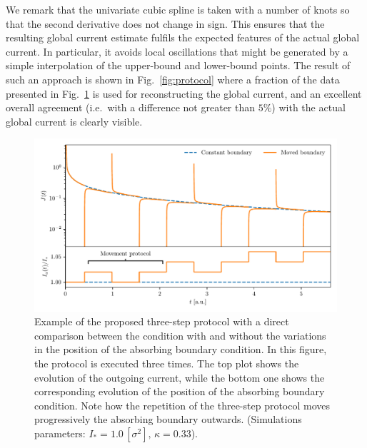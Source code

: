 We remark that the univariate cubic spline is taken with a number of knots so that the second derivative does not change in sign. This ensures that the resulting global current estimate fulfils the expected features of the actual global current. In particular, it avoids local oscillations that might be generated by a simple interpolation of the upper-bound and lower-bound points. The result of such an approach is shown in Fig.~\ref{fig:protocol} where a fraction of the data presented in Fig.~\ref{fig:9} is used for reconstructing the global current, and an excellent overall agreement  {(i.e.\ with a difference not greater than $5\%$)} with the actual global current is clearly visible.
%
\begin{figure}[htp]
    \centering
    \includegraphics[width=\textwidth]{4_probing_the_diffusive_behavior/figs/final/the_protocol.pdf}
    \caption{Example of the proposed three-step protocol with a direct comparison between the condition with and without the variations in the position of the absorbing boundary condition. In this figure, the protocol is executed three times. The top plot shows the evolution of the outgoing current, while the bottom one shows the corresponding evolution of the position of the absorbing boundary condition. Note how the repetition of the three-step protocol moves progressively the absorbing boundary outwards. (Simulations parameters: $I_\ast = 1.0\,[\sigma^2],\,\kappa = 0.33$).}
    \label{fig:9}
\end{figure}
%
